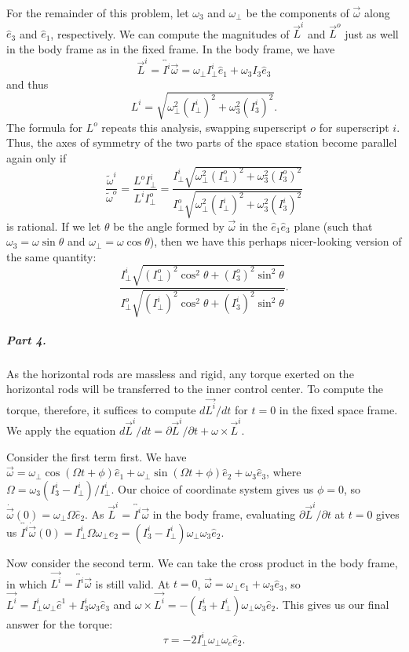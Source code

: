 For the remainder of this problem, let $\omega_3$ and $\omega_\bot$ be the components of $\vec{\omega}$ along $\hat{e}_3$ and $\hat{e}_1$, respectively.  We can compute the magnitudes of $\vec{L}^i$ and $\vec{L}^o$ just as well in the body frame as in the fixed frame.  In the body frame, we have $$\vec{L}^i = \overleftrightarrow{I^i}\vec{\omega} = \omega_\bot I^i_\bot \hat{e}_1 + \omega_3 I_3 \hat{e}_3$$ and thus $$L^i = \sqrt{\omega_\bot^2 (I_\bot^i)^2 + \omega_3^2 (I_3^i)^2}.$$  The formula for $L^o$ repeats this analysis, swapping superscript $o$ for superscript $i$.  Thus, the axes of symmetry of the two parts of the space station become parallel again only if $$\frac{\tilde{\omega}^i}{\tilde{\omega}^o} = \frac{L^o I^i_\bot}{L^i I^o_\bot} = \frac{I^i_\bot \sqrt{\omega_\bot^2 (I_\bot^o)^2 + \omega_3^2 (I_3^o)^2}}{I^o_\bot \sqrt{\omega_\bot^2 (I_\bot^i)^2 + \omega_3^2 (I_3^i)^2}}$$ is rational.  If we let $\theta$ be the angle formed by $\vec{\omega}$ in the $\hat{e}_1 \hat{e}_3$ plane (such that $\omega_3 = \omega \sin \theta$ and $\omega_\bot = \omega \cos \theta$), then we have this perhaps nicer-looking version of the same quantity: $$\frac{I^i_\bot \sqrt{(I^o_\bot )^2 \cos^2 \theta + (I^o_3)^2 \sin^2 \theta}}{I^o_\bot \sqrt{(I^i_\bot)^2 \cos^2 \theta + (I^i_3)^2 \sin^2 \theta}}.$$

\subparagraph{Part 4.}  As the horizontal rods are massless and rigid, any torque exerted on the horizontal rods will be transferred to the inner control center.  To compute the torque, therefore, it suffices to compute $d\vec{L^i}/dt$ for $t = 0$ in the fixed space frame.  We apply the equation $d\vec{L}^i/dt = \partial \vec{L}^i/\partial t + \omega \times \vec{L}^i$.

Consider the first term first.  We have $\vec{\omega} = \omega_\bot \cos (\Omega t + \phi) \hat{e}_1 + \omega_\bot \sin (\Omega t + \phi) \hat{e}_2 + \omega_3 \hat{e}_3$, where $\Omega = \omega_3 (I^i_3 - I^i_\bot)/I^i_\bot$.  Our choice of coordinate system gives us $\phi = 0$, so $\dot{\vec{\omega}}(0) = \omega_\bot \Omega \hat{e}_2$.  As $\vec{L}^i = \overleftrightarrow{I^i} \vec{\omega}$ in the body frame, evaluating $\partial \vec{L}^i/\partial t$ at $t = 0$ gives us $\overleftrightarrow{I^i} \dot{\vec{\omega}}(0) = I^i_\bot \Omega \omega_\bot \hat{e}_2 = (I^i_3 - I^i_\bot) \omega_\bot \omega_3 \hat{e}_2$.

Now consider the second term.  We can take the cross product in the body frame, in which $\vec{L^i} = \overleftrightarrow{I^i} \vec{\omega}$ is still valid.  At $t = 0$, $\vec{\omega} = \omega_\bot \hat{e}_1 + \omega_3 \hat{e}_3$, so $\vec{L^i} = I^i_\bot \omega_\bot \hat{e}^1 + I^i_3 \omega_3 \hat{e}_3$ and $\omega \times \vec{L^i} = - (I^i_3 + I^i_\bot) \omega_\bot \omega_3 \hat{e}_2$.  This gives us our final answer for the torque: $$\boxed{\tau = - 2 I^i_\bot \omega_\bot \omega_e \hat{e}_2.}$$


